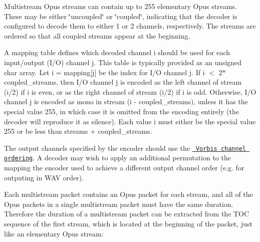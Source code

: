 Multistream Opus streams can contain up to 255 elementary Opus streams. These may be either \char`\"{}uncoupled\char`\"{} or \char`\"{}coupled\char`\"{}, indicating that the decoder is configured to decode them to either 1 or 2 channels, respectively. The streams are ordered so that all coupled streams appear at the beginning.

A {\ttfamily mapping} table defines which decoded channel {\ttfamily i} should be used for each input/output (I/O) channel {\ttfamily j}. This table is typically provided as an unsigned char array. Let {\ttfamily i = mapping\mbox{[}j\mbox{]}} be the index for I/O channel {\ttfamily j}. If {\ttfamily i $<$ 2$\ast$coupled\+\_\+streams}, then I/O channel {\ttfamily j} is encoded as the left channel of stream {\ttfamily (i/2)} if {\ttfamily i} is even, or as the right channel of stream {\ttfamily (i/2)} if {\ttfamily i} is odd. Otherwise, I/O channel {\ttfamily j} is encoded as mono in stream {\ttfamily (i -\/ coupled\+\_\+streams)}, unless it has the special value 255, in which case it is omitted from the encoding entirely (the decoder will reproduce it as silence). Each value {\ttfamily i} must either be the special value 255 or be less than {\ttfamily streams + coupled\+\_\+streams}.

The output channels specified by the encoder should use the \href{http://www.xiph.org/vorbis/doc/Vorbis_I_spec.html\#x1-800004.3.9}{\texttt{ Vorbis channel ordering}}. A decoder may wish to apply an additional permutation to the mapping the encoder used to achieve a different output channel order (e.\+g. for outputing in W\+AV order).

Each multistream packet contains an Opus packet for each stream, and all of the Opus packets in a single multistream packet must have the same duration. Therefore the duration of a multistream packet can be extracted from the T\+OC sequence of the first stream, which is located at the beginning of the packet, just like an elementary Opus stream\+:


\begin{DoxyCode}{0}
\end{DoxyCode}


